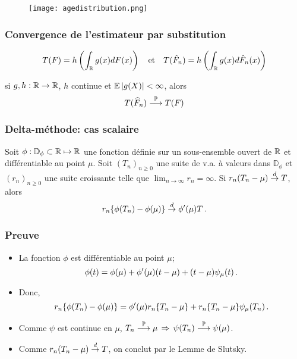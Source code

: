 \begin{frame}
\begin{figure}
  \centering
  \texttt{[image: agedistribution.png]}\\
\end{figure}
\end{frame}




\begin{frame}
\frametitle{Convergence  de l'estimateur par substitution}
\[
T(F)= h \left( \int_{\mathbb{R}} g(x) dF(x) \right) \quad \text{et} \quad T(\hat{F}_n)= h \left( \int_{\mathbb{R}} g(x) d \hat{F}_n(x) \right)
\]
\begin{theo}[Convergence]
 si $g,h:\operatorname{{\mathbb R}}\rightarrow \operatorname{{\mathbb R}}$, $h$
continue et $\operatorname{{\mathbb E}}|g(X)|<\infty$, alors
$$
T(\widehat F_n) \stackrel{\operatorname{{\mathbb P}}}{\longrightarrow} T(F)
$$
\end{theo}
\end{frame}

\begin{frame}
\frametitle{Delta-méthode: cas scalaire}
\begin{theo}
Soit $\phi : \mathbb{D}_\phi \subset \mathbb{R} \mapsto \mathbb{R}$ une fonction définie sur un sous-ensemble ouvert de $\mathbb{R}$ et différentiable au point $\mu$. Soit $(T_n)_{n \geq 0}$ une suite de v.a. à valeurs dans $\mathbb{D}_\phi$ et $(r_n)_{n \geq 0}$ une suite croissante telle que $\lim_{n \to \infty} r_n = \infty$. Si $r_n(T_n- \mu) \stackrel{d}{\rightarrow} T$, alors
$$
r_n \{ \phi(T_n) - \phi(\mu) \} \stackrel{d}{\rightarrow} \phi'(\mu) T \,.
$$
\end{theo}
\end{frame}

\begin{frame}
\frametitle{Preuve}
\begin{itemize}
\item La fonction $\phi$ est différentiable au point $\mu$;
\[
\phi(t)= \phi(\mu) + \phi'(\mu) (t-\mu) + (t-\mu) \psi_\mu(t) \,.
\]
\pause \item Donc,
\[
r_n \{ \phi(T_n) - \phi(\mu) \} = \phi'(\mu) r_n \{ T_n - \mu \} + r_n \{ T_n - \mu \} \psi_\mu(T_n) \,.
\]
\pause \item Comme $\psi$ est continue en $\mu$, $T_n \stackrel{\operatorname{{\mathbb P}}}{\longrightarrow} \mu \, \Rightarrow \, \psi(T_n) \stackrel{\operatorname{{\mathbb P}}}{\longrightarrow} \psi(\mu)$.
\pause \item Comme $r_n( T_n - \mu) \stackrel{d}{\rightarrow} T$, on conclut par le Lemme de Slutsky.
\end{itemize}
\end{frame}


